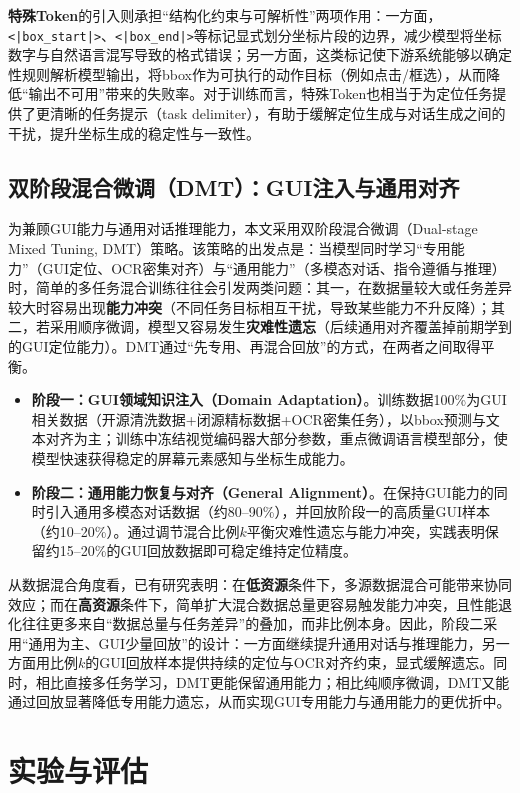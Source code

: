 \textbf{特殊Token}的引入则承担“结构化约束与可解析性”两项作用：一方面，\texttt{<|box\_start|>}、\texttt{<|box\_end|>}等标记显式划分坐标片段的边界，减少模型将坐标数字与自然语言混写导致的格式错误；另一方面，这类标记使下游系统能够以确定性规则解析模型输出，将bbox作为可执行的动作目标（例如点击/框选），从而降低“输出不可用”带来的失败率。对于训练而言，特殊Token也相当于为定位任务提供了更清晰的任务提示（task delimiter），有助于缓解定位生成与对话生成之间的干扰，提升坐标生成的稳定性与一致性。

\subsection{双阶段混合微调（DMT）：GUI注入与通用对齐}
为兼顾GUI能力与通用对话推理能力，本文采用双阶段混合微调（Dual-stage Mixed Tuning, DMT）策略\citep{bai2025qwen25vl}。该策略的出发点是：当模型同时学习“专用能力”（GUI定位、OCR密集对齐）与“通用能力”（多模态对话、指令遵循与推理）时，简单的多任务混合训练往往会引发两类问题：其一，在数据量较大或任务差异较大时容易出现\textbf{能力冲突}（不同任务目标相互干扰，导致某些能力不升反降）；其二，若采用顺序微调，模型又容易发生\textbf{灾难性遗忘}（后续通用对齐覆盖掉前期学到的GUI定位能力）。DMT通过“先专用、再混合回放”的方式，在两者之间取得平衡。
\begin{itemize}
  \item \textbf{阶段一：GUI领域知识注入（Domain Adaptation）}。训练数据100\%为GUI相关数据（开源清洗数据+闭源精标数据+OCR密集任务），以bbox预测与文本对齐为主；训练中冻结视觉编码器大部分参数，重点微调语言模型部分，使模型快速获得稳定的屏幕元素感知与坐标生成能力。
  \item \textbf{阶段二：通用能力恢复与对齐（General Alignment）}。在保持GUI能力的同时引入通用多模态对话数据（约80--90\%），并回放阶段一的高质量GUI样本（约10--20\%）。通过调节混合比例$k$平衡灾难性遗忘与能力冲突，实践表明保留约15--20\%的GUI回放数据即可稳定维持定位精度。
\end{itemize}

从数据混合角度看，已有研究表明：在\textbf{低资源}条件下，多源数据混合可能带来协同效应；而在\textbf{高资源}条件下，简单扩大混合数据总量更容易触发能力冲突，且性能退化往往更多来自“数据总量与任务差异”的叠加，而非比例本身。因此，阶段二采用“通用为主、GUI少量回放”的设计：一方面继续提升通用对话与推理能力，另一方面用比例$k$的GUI回放样本提供持续的定位与OCR对齐约束，显式缓解遗忘。同时，相比直接多任务学习，DMT更能保留通用能力；相比纯顺序微调，DMT又能通过回放显著降低专用能力遗忘，从而实现GUI专用能力与通用能力的更优折中。

\section{实验与评估}
